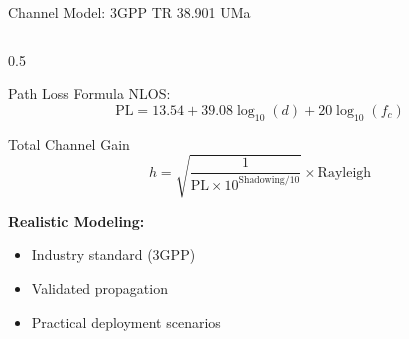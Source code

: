 \documentclass[aspectratio=169]{beamer}
\begin{document}
\begin{frame}{Channel Model: 3GPP TR 38.901 UMa}
\begin{columns}
\begin{column}{0.5\textwidth}
\begin{block}{Path Loss Formula}
                NLOS:
                \begin{equation*}
                    \text{PL} = 13.54 + 39.08\log_{10}(d) + 20\log_{10}(f_c)
                \end{equation*}
            \end{block}
            
            \vspace{0.2cm}
            
            \begin{block}{Total Channel Gain}
                \begin{equation*}
                    h = \sqrt{\frac{1}{\text{PL} \times 10^{\text{Shadowing}/10}}} \times \text{Rayleigh}
                \end{equation*}
            \end{block}
            
            \vspace{0.2cm}
            
            \textbf{Realistic Modeling:}
            \begin{itemize}
                \item Industry standard (3GPP)
                \item Validated propagation
                \item Practical deployment scenarios
            \end{itemize}
        \end{column}
    \end{columns}
\end{frame}
\end{document}
